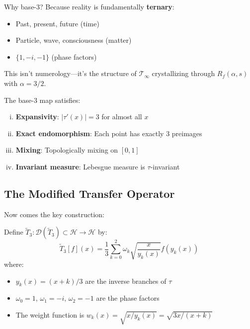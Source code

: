 \begin{keyidea}
Why base-3? Because reality is fundamentally \textbf{ternary}:
\begin{itemize}
\item Past, present, future (time)
\item Particle, wave, consciousness (matter)
\item $\{1, -i, -1\}$ (phase factors)
\end{itemize}
This isn't numerology—it's the structure of $\mathcal{T}_\infty$ crystallizing through $R_f(\alpha, s)$ with $\alpha = 3/2$.
\end{keyidea}

\begin{proposition}\label{prop:base3-properties}
The base-3 map satisfies:
\begin{enumerate}[(i)]
\item \textbf{Expansivity}: $|\tau'(x)| = 3$ for almost all $x$
\item \textbf{Exact endomorphism}: Each point has exactly 3 preimages
\item \textbf{Mixing}: Topologically mixing on $[0,1]$
\item \textbf{Invariant measure}: Lebesgue measure is $\tau$-invariant
\end{enumerate}
\end{proposition}

\subsection{The Modified Transfer Operator}

Now comes the key construction:

\begin{construction}\label{const:modified-transfer-op}
Define $\tilde{T}_3: \mathcal{D}(\tilde{T}_3) \subset \mathcal{H} \to \mathcal{H}$ by:
\begin{equation}\label{eq:modified-transfer-op}
\boxed{\tilde{T}_3[f](x) = \frac{1}{3}\sum_{k=0}^{2} \omega_k \sqrt{\frac{x}{y_k(x)}} f(y_k(x))}
\end{equation}
where:
\begin{itemize}
\item $y_k(x) = (x+k)/3$ are the inverse branches of $\tau$
\item $\omega_0 = 1$, $\omega_1 = -i$, $\omega_2 = -1$ are the phase factors
\item The weight function is $w_k(x) = \sqrt{x/y_k(x)} = \sqrt{3x/(x+k)}$
\end{itemize}
\end{construction}

